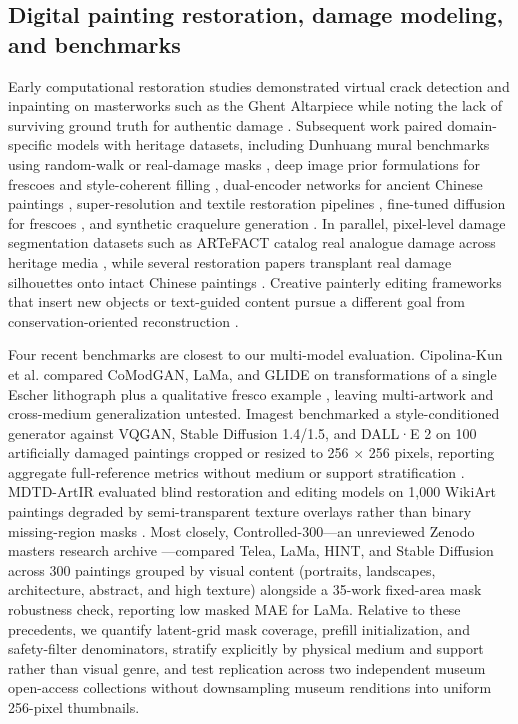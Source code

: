 \documentclass[applsci,article,submit,pdftex,moreauthors]{Definitions/mdpi}
\begin{document}
\subsection{Digital painting restoration, damage modeling, and benchmarks}\label{digital-painting-restoration-damage-modeling-and-benchmarks}

Early computational restoration studies demonstrated virtual crack detection and inpainting on masterworks such as the Ghent Altarpiece while noting the lack of surviving ground truth for authentic damage \citep{cornelis2013}. Subsequent work paired domain-specific models with heritage datasets, including Dunhuang mural benchmarks using random-walk or real-damage masks \citep{yu2019dunhuang, shao2023, xu2024dunhuang}, deep image prior formulations for frescoes and style-coherent filling \citep{merizzi2024, morotti2024}, dual-encoder networks for ancient Chinese paintings \citep{sun2024}, super-resolution and textile restoration pipelines \citep{hu2024, wang2024silk}, fine-tuned diffusion for frescoes \citep{smolka2025}, and synthetic craquelure generation \citep{cuchguillen2026}. In parallel, pixel-level damage segmentation datasets such as ARTeFACT catalog real analogue damage across heritage media \citep{ivanova2024artefact}, while several restoration papers transplant real damage silhouettes onto intact Chinese paintings \citep{zhang2026inkrenew, xue2025}. Creative painterly editing frameworks that insert new objects or text-guided content pursue a different goal from conservation-oriented reconstruction \citep{xu2023refpaint, fanelli2024}.

Four recent benchmarks are closest to our multi-model evaluation. Cipolina-Kun et al. compared CoModGAN, LaMa, and GLIDE on transformations of a single Escher lithograph plus a qualitative fresco example \citep{cipolinakun2022}, leaving multi-artwork and cross-medium generalization untested. Imagest benchmarked a style-conditioned generator against VQGAN, Stable Diffusion 1.4/1.5, and DALL·E 2 on 100 artificially damaged paintings cropped or resized to 256 \ensuremath{\times} 256 pixels, reporting aggregate full-reference metrics without medium or support stratification \citep{hu2025imagest}. MDTD-ArtIR evaluated blind restoration and editing models on 1,000 WikiArt paintings degraded by semi-transparent texture overlays rather than binary missing-region masks \citep{vijendran2026}. Most closely, Controlled-300---an unreviewed Zenodo master\textquotesingle s research archive \citep{controlled300}---compared Telea, LaMa, HINT, and Stable Diffusion across 300 paintings grouped by visual content (portraits, landscapes, architecture, abstract, and high texture) alongside a 35-work fixed-area mask robustness check, reporting low masked MAE for LaMa. Relative to these precedents, we quantify latent-grid mask coverage, prefill initialization, and safety-filter denominators, stratify explicitly by physical medium and support rather than visual genre, and test replication across two independent museum open-access collections without downsampling museum renditions into uniform 256-pixel thumbnails.
\end{document}
